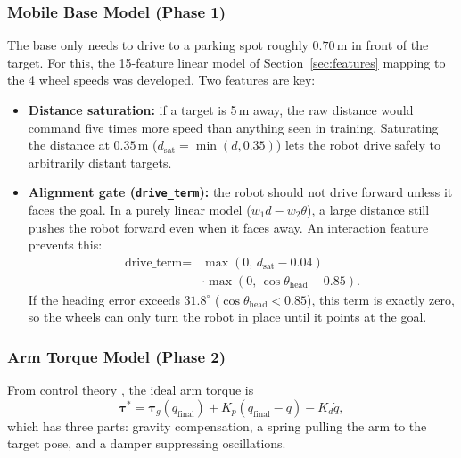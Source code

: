 \documentclass[conference]{IEEEtran}
\begin{document}
\subsubsection{Mobile Base Model (Phase 1)}
The base only needs to drive to a parking spot roughly $0.70\,\text{m}$ in front of the target. For this, the 15-feature linear model of Section~\ref{sec:features} mapping to the 4 wheel speeds was developed. Two features are key:
\begin{itemize}
    \item \textbf{Distance saturation:} if a target is 5\,m away, the raw distance would command five times more speed than anything seen in training. Saturating the distance at $0.35\,\text{m}$ ($d_{\text{sat}} = \min(d, 0.35)$) lets the robot drive safely to arbitrarily distant targets.
    \item \textbf{Alignment gate (\texttt{drive\_term}):} the robot should not drive forward unless it faces the goal. In a purely linear model ($w_1 d - w_2 \theta$), a large distance still pushes the robot forward even when it faces away. An interaction feature prevents this:
    \begin{equation}
    \begin{aligned}
    \text{drive\_term} = {}&\max(0,\, d_{\text{sat}} - 0.04)\\
    &\cdot \max(0,\, \cos\theta_{\text{head}} - 0.85).
    \end{aligned}
    \end{equation}
    If the heading error exceeds $31.8^\circ$ ($\cos\theta_{\text{head}} < 0.85$), this term is exactly zero, so the wheels can only turn the robot in place until it points at the goal.
\end{itemize}

\subsubsection{Arm Torque Model (Phase 2)}
From control theory \cite{takegaki1981new}, the ideal arm torque is
\begin{equation}
\boldsymbol{\tau}^* = \boldsymbol{\tau}_g(q_{\text{final}}) + K_p(q_{\text{final}} - q) - K_d \dot{q},
\end{equation}
which has three parts: gravity compensation, a spring pulling the arm to the target pose, and a damper suppressing oscillations.
\end{document}
